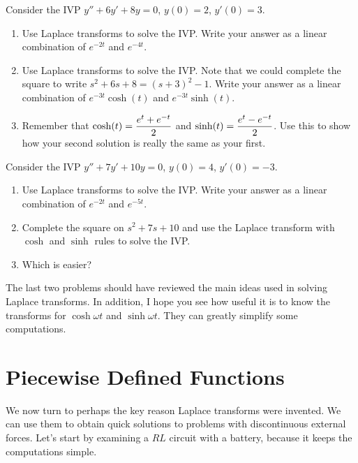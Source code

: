 \begin{problem}
 Consider the IVP $y''+6y'+8y = 0$, $y(0)=2$, $y'(0)=3$.
\begin{enumerate}
 \item Use Laplace transforms to solve the IVP.  Write your answer as a linear combination of $e^{-2t}$ and $e^{-4t}$.  
 \item Use Laplace transforms to solve the IVP. Note that we could complete the square to write $s^2+6s+8=(s+3)^2-1$.  Write your answer as a linear combination of $e^{-3t}\cosh(t)$ and $e^{-3t}\sinh(t)$.
 \item Remember that $\displaystyle \cosh(t) = \frac{e^t+e^{-t}}{2}$ and $\displaystyle \sinh(t) = \frac{e^t-e^{-t}}{2}$. Use this to show how your second solution is really the same as your first.
\end{enumerate}

\end{problem}

\begin{problem}
 Consider the IVP $y''+7y'+10y = 0$, $y(0)=4$, $y'(0)=-3$.
\begin{enumerate}
 \item Use Laplace transforms to solve the IVP.  Write your answer as a linear combination of $e^{-2t}$ and $e^{-5t}$.  
 \item Complete the square on $s^2+7s+10$ and use the Laplace transform with $\cosh$ and $\sinh$ rules to solve the IVP.
 \item Which is easier?
\end{enumerate}

\end{problem}


The last two problems should have reviewed the main ideas used in solving Laplace transforms.  In addition, I hope you see how useful it is to know the transforms for $\cosh\omega t$ and $\sinh\omega t$.  They can greatly simplify some computations.

\section{Piecewise Defined Functions}

We now turn to perhaps the key reason Laplace transforms were invented.  We can use them to obtain quick solutions to problems with discontinuous external forces.  Let's start by examining a $RL$ circuit with a battery, because it keeps the computations simple.

